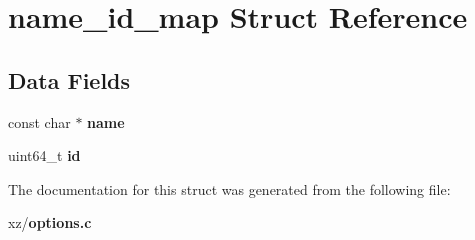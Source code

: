 \section{name\-\_\-id\-\_\-map Struct Reference}
\label{structname__id__map}
\subsection*{Data Fields}
\begin{DoxyCompactItemize}
\item 
const char $\ast$ {\bfseries name}\label{structname__id__map_a962b8d1fce6d3caa766b94e6f6bb920d}

\item 
uint64\-\_\-t {\bfseries id}\label{structname__id__map_a7f9b230a51d75dbcce8d8420578fee09}

\end{DoxyCompactItemize}


The documentation for this struct was generated from the following file\-:\begin{DoxyCompactItemize}
\item 
xz/{\bf options.\-c}\end{DoxyCompactItemize}
